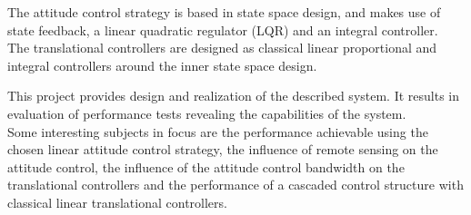The attitude control strategy is based in state space design, and makes use of state feedback, a linear quadratic regulator (LQR) and an integral controller.\\
The translational controllers are designed as classical linear proportional and integral controllers around the inner state space design.

This project provides design and realization of the described system. It results in evaluation of performance tests revealing the capabilities of the system.\\
Some interesting subjects in focus are the performance achievable using the chosen linear attitude control strategy, the influence of remote sensing on the attitude control, the influence of the attitude control bandwidth on the translational controllers and the performance of a cascaded control structure with classical linear translational controllers.














